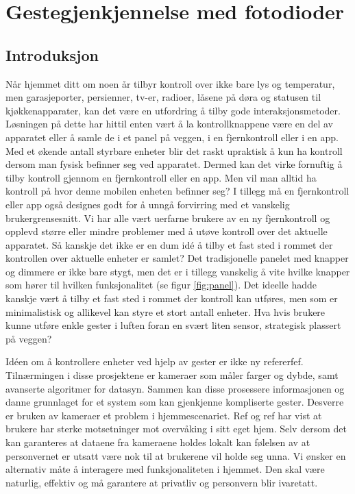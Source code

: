 \section{Gestegjenkjennelse med fotodioder}
\subsection{Introduksjon}
Når hjemmet ditt om noen år tilbyr kontroll over ikke bare lys og temperatur, men garasjeporter, persienner, tv-er, radioer, låsene på døra og statusen til kjøkkenapparater, kan det være en utfordring å tilby gode interaksjonsmetoder. Løsningen på dette har hittil enten vært å la kontrollknappene være en del av apparatet eller å samle de i et panel på veggen, i en fjernkontroll eller i en app. Med et økende antall styrbare enheter blir det raskt upraktisk å kun ha kontroll dersom man fysisk befinner seg ved apparatet. Dermed kan det virke fornuftig å tilby kontroll gjennom en fjernkontroll eller en app. Men vil man alltid ha kontroll på hvor denne mobilen enheten befinner seg? I tillegg må en fjernkontroll eller app også designes godt for å unngå forvirring med et vanskelig brukergrensesnitt. Vi har alle vært uerfarne brukere av en ny fjernkontroll og opplevd større eller mindre problemer med å utøve kontroll over det aktuelle apparatet. Så kanskje det ikke er en dum idé å tilby et fast sted i rommet der kontrollen over aktuelle enheter er samlet? Det tradisjonelle panelet med knapper og dimmere er ikke bare stygt, men det er i tillegg vanskelig å vite hvilke knapper som hører til hvilken funksjonalitet (se figur \ref{fig:panel}). Det ideelle hadde kanskje vært å tilby et fast sted i rommet der kontroll kan utføres, men som er minimalistisk og allikevel kan styre et stort antall enheter. Hva hvis brukere kunne utføre enkle gester i luften foran en svært liten sensor, strategisk plassert på veggen?
 
Idéen om å kontrollere enheter ved hjelp av gester er ikke ny {\color{red} refererfef}. Tilnærmingen i disse prosjektene er kameraer som måler farger og dybde, samt avanserte algoritmer for datasyn. Sammen kan disse prosessere informasjonen og danne grunnlaget for et system som kan gjenkjenne kompliserte gester. Desverre er bruken av kameraer et problem i hjemmescenariet. {\color{red} Ref og ref} har vist at brukere har sterke motsetninger mot overvåking i sitt eget hjem. Selv dersom det kan garanteres at dataene fra kameraene holdes lokalt kan følelsen av at personvernet er utsatt være nok til at brukerene vil holde seg unna. Vi ønsker en alternativ måte å interagere med funksjonaliteten i hjemmet. Den skal være naturlig, effektiv og må garantere at privatliv og personvern blir ivaretatt.

